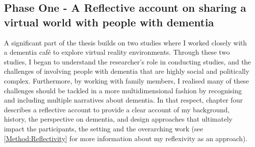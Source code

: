 \begin{table}[htp]
\centering
\caption{Overview of collected data}
\label{tab:OverviewDataCollection}
\end{table}

\subsection{Phase One - A Reflective account on sharing a virtual world with people with dementia}

A significant part of the thesis builds on two studies where I worked closely with a dementia café to explore virtual reality environments. Through these two studies, I began to understand the researcher's role in conducting studies, and the challenges of involving people with dementia that are highly social and politically complex. Furthermore, by working with family members, I realised many of these challenges should be tackled in a more multidimensional fashion by recognising and including multiple narratives about dementia. In that respect, chapter four describes a reflective account to provide a clear account of my background, history, the perspective on dementia, and design approaches that ultimately impact the participants, the setting and the overarching work (see \ref{Method:Reflectivity} for more information about my reflexivity as an approach).

